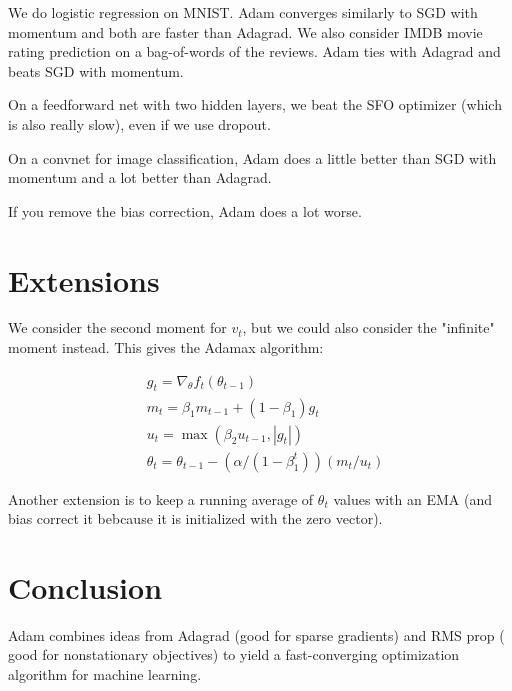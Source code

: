 \documentclass[a4paper]{article}
\begin{document}
We do logistic regression on MNIST. Adam converges similarly to SGD with
momentum and both are faster than Adagrad. We also consider IMDB movie
rating prediction on a bag-of-words of the reviews. Adam ties with Adagrad
and beats SGD with momentum.

On a feedforward net with two hidden layers, we beat the SFO optimizer (which
is also really slow), even if we use dropout.

On a convnet for image classification, Adam does a little better than SGD
with momentum and a lot better than Adagrad.

If you remove the bias correction, Adam does a lot worse.

\section{Extensions}
We consider the second moment for $v_t$, but we could also consider the
"infinite" moment instead. This gives the Adamax algorithm:

\begin{align}
  & g_t = \nabla_{\theta} f_t(\theta_{t-1}) \\
  & m_t = \beta_1 m_{t-1} + (1 - \beta_1)  g_t \\
  & u_t = \max(\beta_2 u_{t-1}, |g_t|) \\
  & \theta_t = \theta_{t-1} - (\alpha / (1 - \beta_1^t)) (m_t / u_t)
\end{align}

Another extension is to keep a running average of $\theta_t$ values with an
EMA (and bias correct it bebcause it is initialized with the zero vector).

\section{Conclusion}
Adam combines ideas from Adagrad (good for sparse gradients) and RMS prop (
good for nonstationary objectives) to yield a fast-converging optimization
algorithm for machine learning.
\end{document}
